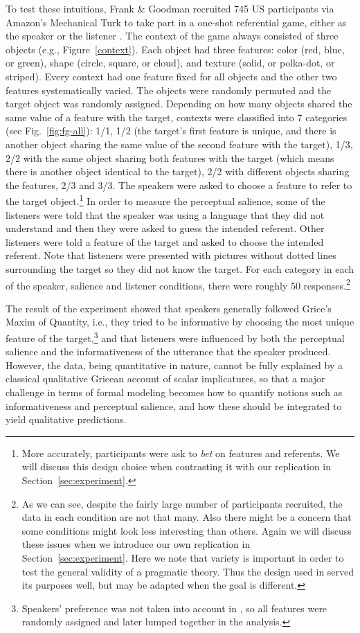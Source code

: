 To test these intuitions, Frank \& Goodman recruited 745 US
participants via Amazon's Mechanical Turk to take part in a one-shot
referential game, either as the speaker or the listener \cite{Frank}.
The context of the game always consisted of three objects (e.g.,
Figure~\ref{context}).  Each object had three features: color (red,
blue, or green), shape (circle, square, or cloud), and texture (solid,
or polka-dot, or striped).  Every context had one feature fixed for
all objects and the other two features systematically varied.  The
objects were randomly permuted and the target object was randomly
assigned.  Depending on how many objects shared the same value of a
feature with the target, contexts were classified into 7 categories
(see Fig.~\ref{fig:fg-all}): 1/1, 1/2 (the target's first feature is
unique, and there is another object sharing the same value of the
second feature with the target), 1/3, 2/2 with the same object sharing
both features with the target (which means there is another object
identical to the target), 2/2 with different objects sharing the
features, 2/3 and 3/3.  The speakers were asked to choose a feature to
refer to the target object.\footnote{More accurately, participants
  were ask to \emph{bet} on features and referents. We will discuss
  this design choice when contrasting it with our replication in
  Section~\ref{sec:experiment}.}  In order to measure the perceptual
salience, some of the listeners were told that the speaker was using a
language that they did not understand and then they were asked to
guess the intended referent.  Other listeners were told a feature of
the target and asked to choose the intended referent.  Note that
listeners were presented with pictures without dotted lines
surrounding the target so they did not know the target.  For each
category in each of the speaker, salience and listener conditions,
there were roughly 50 responses.\footnote{As we can see, despite the
  fairly large number of participants recruited, the data in each
  condition are not that many. Also there might be a concern that some
  conditions might look less interesting than others. Again we will
  discuss these issues when we introduce our own replication in
  Section~\ref{sec:experiment}. Here we note that variety is important
  in order to test the general validity of a pragmatic theory.  Thus
  the design used in \cite{Frank} served its purposes well, but may be
  adapted when the goal is different.}

The result of the experiment showed that speakers generally followed
Grice's Maxim of Quantity, i.e., they tried to be informative by
choosing the most unique feature of the target,\footnote{Speakers'
  preference was not taken into account in \cite{Frank}, so all
  features were randomly assigned and later lumped together in the
  analysis.} and that listeners were influenced by both the perceptual
salience and the informativeness of the utterance that the speaker
produced. However, the data, being quantitative in nature, cannot be
fully explained by a classical qualitative Gricean account of scalar
implicatures, so that a major challenge in terms of formal modeling
becomes how to quantify notions such as informativeness and perceptual
salience, and how these should be integrated to yield qualitative
predictions.

